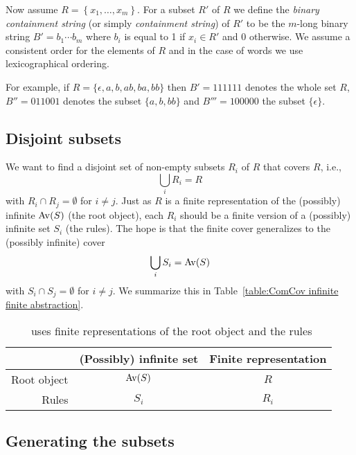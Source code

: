 Now assume $R = \left\{ x_1, \ldots, x_m \right\}$. For a subset $R'$ of $R$ we 
define the \emph{binary containment string} (or simply \emph{containment 
string}) of $R'$ to be the $m$-long binary string $B' = b_1 \cdots b_m$ where 
$b_i$ is equal to 1 if $x_i \in R'$ and 0 otherwise. We assume a consistent 
order for the elements of $R$ and in the case of words we use lexicographical 
ordering.

For example, if $R = \{\epsilon, a, b, ab, ba, bb\}$ then $B' = 111111$ denotes the 
whole set $R$, $B'' = 011001$ denotes the subset $\{a, b, bb\}$ and $B''' = 100000$ 
the subset $\{\epsilon\}$.


\subsection{Disjoint subsets}

We want to find a disjoint set of non-empty subsets $R_i$ of $R$ that covers 
$R$, i.e., \[\bigcup_i R_i = R\] with $R_i \cap R_j = \emptyset$ for $i \neq j$. 
Just as $R$ is a finite representation of the (possibly) infinite ${\mathrm{Av}\!\left(S\right)}$ (the 
root object), each $R_i$ should be a finite version of a (possibly) infinite set 
$S_i$ (the rules). The hope is that the finite cover generalizes to the 
(possibly infinite) cover \[\bigcup_i S_i = {\mathrm{Av}\!\left(S\right)}\] with $S_i \cap S_j = 
\emptyset$ for $i \neq j$. We summarize this in Table~\ref{table:ComCov infinite 
finite abstraction}.

\begin{table}[ht]
    \centering
    \begin{tabular}{ | r || c | c | }
        \hline
         & (Possibly) infinite set & Finite representation \\
        \hline\hline
        Root object & ${\mathrm{Av}\!\left(S\right)}$ & $R$   \\ \hline
        Rules       & $S_i$    & $R_i$ \\ \hline
    \end{tabular}
    \caption{\CombCov\ uses finite representations of the root object and the rules}
    \label{table:ComCov infinite finite abstraction}
\end{table}


\subsection{Generating the subsets}

